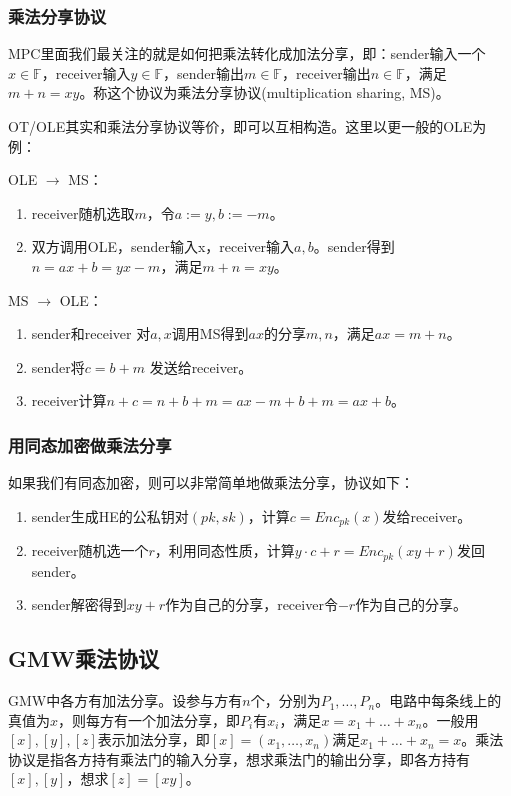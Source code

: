 \documentclass[UTF8]{ctexart}
\theoremstyle{nonumberplain}
\theoremstyle{plain}
\begin{document}
\subsubsection{乘法分享协议}
MPC里面我们最关注的就是如何把乘法转化成加法分享，即：sender输入一个$x\in \mathbb{F}$，receiver输入$y\in \mathbb{F}$，sender输出$m\in \mathbb{F}$，receiver输出$n\in \mathbb{F}$，满足$m+n=xy$。称这个协议为乘法分享协议(multiplication sharing, MS)。

OT/OLE其实和乘法分享协议等价，即可以互相构造。这里以更一般的OLE为例：

OLE $\rightarrow$ MS：\begin{enumerate}\item receiver随机选取$m$，令$a:=y, b:=-m$。\item 双方调用OLE，sender输入x，receiver输入$a,b$。sender得到$n = ax + b = yx - m$，满足$m + n = xy$。\end{enumerate}

MS $\rightarrow$ OLE：\begin{enumerate}\item sender和receiver 对$a,x$调用MS得到$ax$的分享$m,n$，满足$ax = m + n$。\item sender将$c = b + m$ 发送给receiver。\item receiver计算$n + c =n+b+m= ax - m + b + m = ax + b$。\end{enumerate}

\subsubsection{用同态加密做乘法分享}
如果我们有同态加密，则可以非常简单地做乘法分享，协议如下：
\begin{enumerate}
\item sender生成HE的公私钥对$(pk,sk)$，计算$c=Enc_{pk}(x)$发给receiver。
\item receiver随机选一个$r$，利用同态性质，计算$y\cdot c+r =Enc_{pk}(xy+r)$发回sender。
\item sender解密得到$xy+r$作为自己的分享，receiver令$-r$作为自己的分享。
\end{enumerate}
\subsection{GMW乘法协议}
GMW中各方有加法分享。设参与方有$n$个，分别为$P_1,\dots, P_n$。电路中每条线上的真值为$x$，则每方有一个加法分享，即$P_i$有$x_i$，满足$x=x_1+\dots + x_n$。一般用$[x],[y],[z]$表示加法分享，即$[x]=(x_1,\dots,x_n)$满足$x_1+\dots +x_n = x$。乘法协议是指各方持有乘法门的输入分享，想求乘法门的输出分享，即各方持有$[x],[y]$，想求$[z]=[xy]$。
\end{document}
